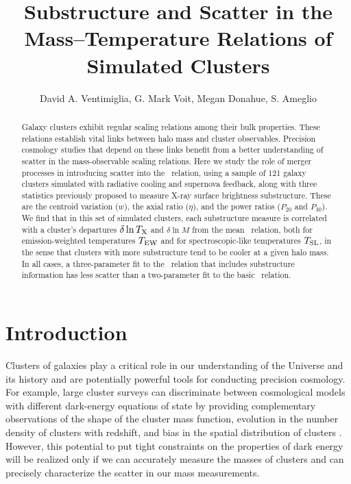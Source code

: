 \documentclass{aastex} \usepackage{natbib}
\begin{document}
\title{Substructure and Scatter in the Mass--Temperature Relations of
  Simulated Clusters}

\author{
  David A. Ventimiglia,
  G. Mark Voit,
  Megan Donahue,
  S. Ameglio
}



\begin{abstract}
  Galaxy clusters exhibit regular scaling relations among their bulk
  properties.  These relations establish vital links between halo mass
  and cluster observables.  Precision cosmology studies that depend on
  these links benefit from a better understanding of scatter in the
  mass-observable scaling relations.  Here we study the role of merger
  processes in introducing scatter into the \mtx\ relation, using a
  sample of 121 galaxy clusters simulated with radiative cooling and
  supernova feedback, along with three statistics previously proposed
  to measure X-ray surface brightness substructure.  These are the
  centroid variation ($w$), the axial ratio ($\eta$), and the power
  ratios ($P_{20}$ and $P_{30}$).  We find that in this set of simulated clusters,
  each substructure measure is correlated with a cluster's departures
  $\delta \ln T_{\rm X}$ and $\delta \ln M$ from the mean \mtx\ relation,
  both for emission-weighted temperatures $T_{\rm EW}$ and for
  spectroscopic-like temperatures $T_{\rm SL}$, in the sense that clusters
  with more substructure tend to be cooler at a given halo mass.  In
  all cases, a three-parameter fit to the \mtx\ relation that includes
  substructure information has less scatter than a two-parameter fit
  to the basic \mtx\ relation.
\end{abstract}

\section{Introduction}

Clusters of galaxies play a critical role in our understanding of the
Universe and its history and are potentially powerful tools for
conducting precision cosmology.  For example, large cluster surveys
can discriminate between cosmological models with different
dark-energy equations of state by providing complementary observations
of the shape of the cluster mass function, evolution in the number
density of clusters with redshift, and bias in the spatial
distribution of clusters
\citep{1998ApJ...508..483W, 2002ApJ...577..569L,
2003PhRvD..67h1304H,2004ApJ...613...41M,Voit:2005PhysRevD}.
However, this potential to put tight constraints on the properties of
dark energy will be realized only if we can accurately measure the
masses of clusters and can precisely characterize the scatter in our
mass measurements.
\end{document}
